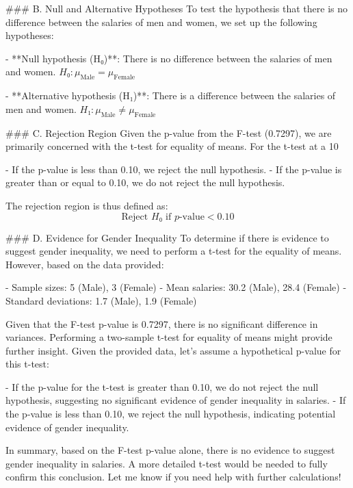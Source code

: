 ### B. Null and Alternative Hypotheses
To test the hypothesis that there is no difference between the salaries of men and women, we set up the following hypotheses:

- **Null hypothesis (H₀)**: There is no difference between the salaries of men and women.
  \( H₀: \mu_{\text{Male}} = \mu_{\text{Female}} \)

- **Alternative hypothesis (H₁)**: There is a difference between the salaries of men and women.
  \( H₁: \mu_{\text{Male}} \neq \mu_{\text{Female}} \)

### C. Rejection Region
Given the p-value from the F-test (0.7297), we are primarily concerned with the t-test for equality of means. For the t-test at a 10%

- If the p-value is less than 0.10, we reject the null hypothesis.
- If the p-value is greater than or equal to 0.10, we do not reject the null hypothesis.

The rejection region is thus defined as:
\[ \text{Reject } H₀ \text{ if } p\text{-value} < 0.10 \]

### D. Evidence for Gender Inequality
To determine if there is evidence to suggest gender inequality, we need to perform a t-test for the equality of means. However, based on the data provided:

- Sample sizes: 5 (Male), 3 (Female)
- Mean salaries: 30.2 (Male), 28.4 (Female)
- Standard deviations: 1.7 (Male), 1.9 (Female)

Given that the F-test p-value is 0.7297, there is no significant difference in variances. Performing a two-sample t-test for equality of means might provide further insight. Given the provided data, let's assume a hypothetical p-value for this t-test:

- If the p-value for the t-test is greater than 0.10, we do not reject the null hypothesis, suggesting no significant evidence of gender inequality in salaries.
- If the p-value is less than 0.10, we reject the null hypothesis, indicating potential evidence of gender inequality.

In summary, based on the F-test p-value alone, there is no evidence to suggest gender inequality in salaries. A more detailed t-test would be needed to fully confirm this conclusion. Let me know if you need help with further calculations!
